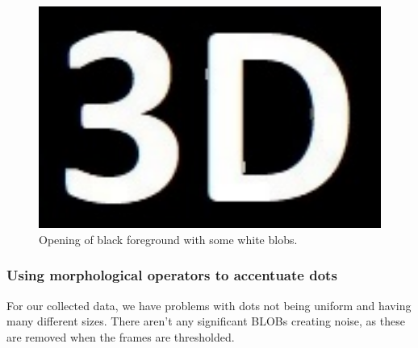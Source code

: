 \begin{figure}[h!]
\begin{minipage}[t]{0.24\textwidth}
	\end{minipage}
	\begin{minipage}[t]{0.24\textwidth}
		\centering	
		\includegraphics[width=1\textwidth]{figures/ImageAnalysis/Reconstruct/3D_Open_Rectangle.jpg}
	\end{minipage}
	\caption{Opening of black foreground with some white blobs.}
	\label{fig:opening}
\end{figure}


\clearpage
\subsubsection{Using morphological operators to accentuate dots}

For our collected data, we have problems with dots not being uniform and having many different sizes. There aren't any significant BLOBs creating noise, as these are removed when the frames are thresholded.\\

